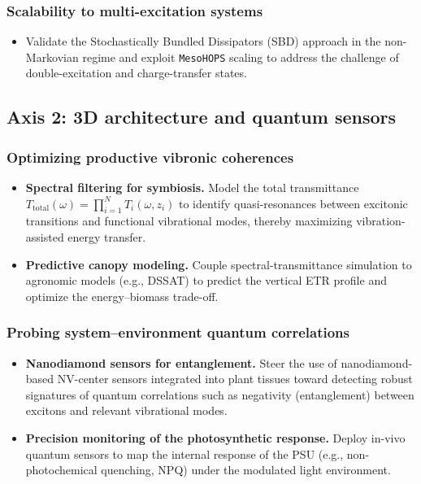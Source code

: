 \documentclass[12pt, a4paper]{article}
\begin{document}
\subsubsection{Scalability to multi-excitation systems}
\begin{itemize}
\item Validate the Stochastically Bundled Dissipators (SBD) approach in the non-Markovian regime and exploit \texttt{MesoHOPS} scaling to address the challenge of double-excitation and charge-transfer states.
\end{itemize}

\subsection{Axis 2: 3D architecture and quantum sensors}

\subsubsection{Optimizing productive vibronic coherences}
\begin{itemize}
    \item \textbf{Spectral filtering for symbiosis.} Model the total transmittance $T_{\text{total}}(\omega) = \prod_{i=1}^N T_i(\omega, z_i)$ to identify quasi-resonances between excitonic transitions and functional vibrational modes, thereby maximizing vibration-assisted energy transfer.

    \item \textbf{Predictive canopy modeling.} Couple spectral-transmittance simulation to agronomic models (e.g., DSSAT) to predict the vertical ETR profile and optimize the energy–biomass trade-off.
\end{itemize}

\subsubsection{Probing system–environment quantum correlations}
\begin{itemize}
    \item \textbf{Nanodiamond sensors for entanglement.} Steer the use of nanodiamond-based NV-center sensors integrated into plant tissues toward detecting robust signatures of quantum correlations such as negativity (entanglement) between excitons and relevant vibrational modes.

    \item \textbf{Precision monitoring of the photosynthetic response.} Deploy in-vivo quantum sensors to map the internal response of the PSU (e.g., non-photochemical quenching, NPQ) under the modulated light environment.
\end{itemize}
\end{document}
